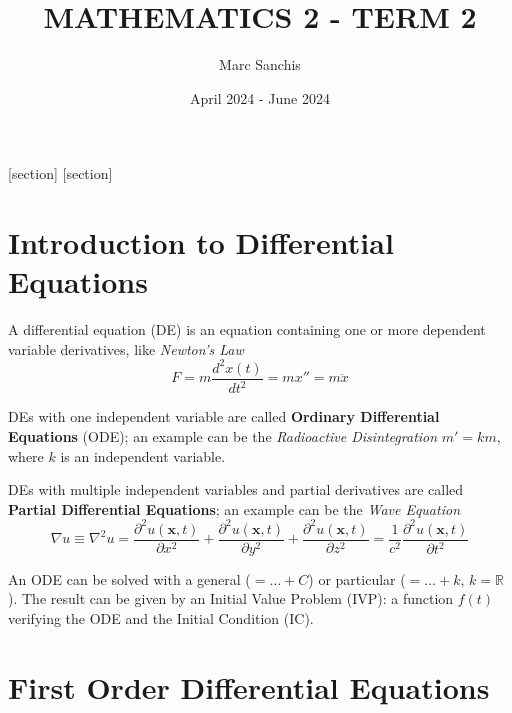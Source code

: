 \documentclass[a4paper]{article}
\title{MATHEMATICS 2 - TERM 2}
\author{Marc Sanchis}
\date{April 2024 - June 2024}
\begin{document}
\maketitle

\renewcommand{\contentsname}{}
\tableofcontents

\newpage
\restoregeometry
\pagestyle{fancy}
\setcounter{section}{5}

[section]
[section]
\setcounter{ex}{0}
\setcounter{prob}{0}

\section{Introduction to Differential Equations}

A differential equation (DE) is an equation containing one or more dependent variable derivatives, like \textit{Newton's Law}
$$
F=m \frac{d^{2}x(t)}{dt^{2}}=mx''=m\ddot{x}
$$

DEs with one independent variable are called \textbf{Ordinary Differential Equations} (ODE); an example can be the \textit{Radioactive Disintegration} $m'=km$, where $k$ is an independent variable.

DEs with multiple independent variables and partial derivatives are called \textbf{Partial Differential Equations}; an example can be the \textit{Wave Equation}
$$
\nabla u\equiv\nabla^{2}u=\frac{\partial^{2}u(\mathbf{x}, t)}{\partial x^{2}}+\frac{\partial^{2}u(\mathbf{x},t)}{\partial y^{2}}+\frac{\partial^{2}u(\mathbf{x},t)}{\partial z^{2}}=\frac{1}{c^{2}}\frac{\partial^{2}u(\mathbf{x},t)}{\partial t^{2}}
$$

\vspace{1ex}\vspace{1ex}

An ODE can be solved with a general ($=\dots+C$) or particular ($=\dots+k,\,k=\mathbb{R}$). The result can be given by an Initial Value Problem (IVP): a function $f(t)$ verifying the ODE and the Initial Condition (IC).

\vspace{1ex}\vspace{1ex}

\section{First Order Differential Equations}
\end{document}
